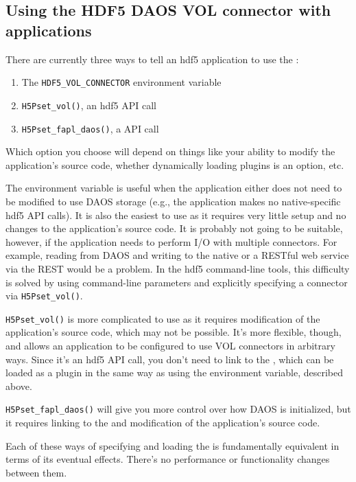 \documentclass[../users_guide.tex]{subfiles}
\begin{document}
\subsection{Using the HDF5 DAOS VOL connector with applications}

There are currently three ways to tell an \acrshort{hdf5} application to use
the \dvc{}: 

\begin{enumerate}
    \item The \texttt{HDF5\_VOL\_CONNECTOR} environment variable
    \item \texttt{H5Pset\_vol()}, an \acrshort{hdf5} API call
    \item \texttt{H5Pset\_fapl\_daos()}, a \dvc{} API call
\end{enumerate}

Which option you choose will depend on things like your ability to modify the
application's source code, whether dynamically loading plugins is an option,
etc.

The environment variable is useful when the application either
does not need to be modified to use DAOS storage (e.g., the application makes
no native-specific \acrshort{hdf5} API calls). It is also the easiest to use
as it requires very little setup and no changes to the application's source
code. It is probably not going to be suitable, however, if the application
needs to perform I/O with multiple connectors. For example, reading from DAOS
and writing to the native \vc{} or a RESTful web service via the REST \vc{}
would be a problem. In the \acrshort{hdf5} command-line tools, this difficulty
is solved by using command-line parameters and explicitly specifying a
connector via \texttt{H5Pset\_vol()}.

\texttt{H5Pset\_vol()} is more complicated to use as it requires modification
of the application's source code, which may not be possible. It's more flexible,
though, and allows an application to be configured to use VOL connectors in
arbitrary ways. Since it's an \acrshort{hdf5} API call, you don't need to
link to the \dvc{}, which can be loaded as a plugin in the same way as using
the environment variable, described above.

\texttt{H5Pset\_fapl\_daos()} will give you more control over how DAOS is
initialized, but it requires linking to the \dvc{} and modification of the
application's source code.

Each of these ways of specifying and loading the \dvc{} is fundamentally
equivalent in terms of its eventual effects. There's no performance or
functionality changes between them.
\end{document}
